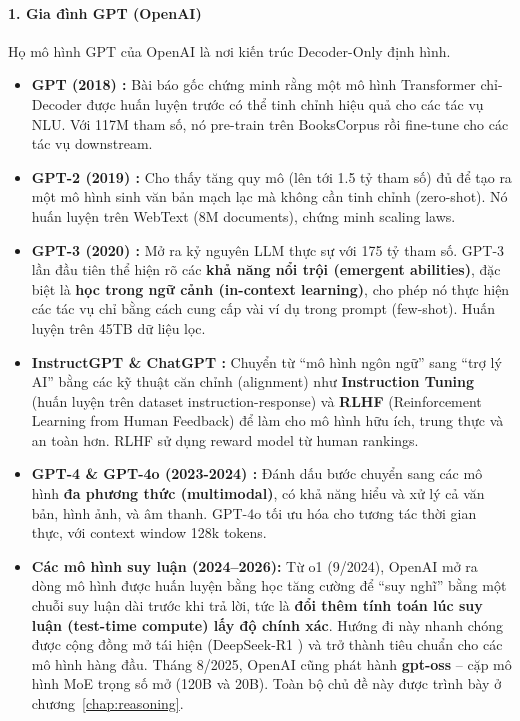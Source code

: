 \paragraph{1. Gia đình GPT (OpenAI)}
Họ mô hình GPT của OpenAI là nơi kiến trúc Decoder-Only định hình.
\begin{itemize}
	\item \textbf{GPT (2018) \cite{radford2018improving}:} Bài báo gốc chứng minh rằng một mô hình Transformer chỉ-Decoder được huấn luyện trước có thể tinh chỉnh hiệu quả cho các tác vụ NLU. Với 117M tham số, nó pre-train trên BooksCorpus rồi fine-tune cho các tác vụ downstream.
	\item \textbf{GPT-2 (2019) \cite{radford2019language}:} Cho thấy tăng quy mô (lên tới 1.5 tỷ tham số) đủ để tạo ra một mô hình sinh văn bản mạch lạc mà không cần tinh chỉnh (zero-shot). Nó huấn luyện trên WebText (8M documents), chứng minh scaling laws.
	\item \textbf{GPT-3 (2020) \cite{brown2020language}:} Mở ra kỷ nguyên LLM thực sự với 175 tỷ tham số. GPT-3 lần đầu tiên thể hiện rõ các \textbf{khả năng nổi trội (emergent abilities)}, đặc biệt là \textbf{học trong ngữ cảnh (in-context learning)}, cho phép nó thực hiện các tác vụ chỉ bằng cách cung cấp vài ví dụ trong prompt (few-shot). Huấn luyện trên 45TB dữ liệu lọc.
	\item \textbf{InstructGPT \& ChatGPT \cite{ouyang2022training}:} Chuyển từ “mô hình ngôn ngữ” sang “trợ lý AI” bằng các kỹ thuật căn chỉnh (alignment) như \textbf{Instruction Tuning} (huấn luyện trên dataset instruction-response) và \textbf{RLHF} (Reinforcement Learning from Human Feedback) để làm cho mô hình hữu ích, trung thực và an toàn hơn. RLHF sử dụng reward model từ human rankings.
	\item \textbf{GPT-4 \& GPT-4o (2023-2024) \cite{openai2023gpt4, openai2024gpt4o}:} Đánh dấu bước chuyển sang các mô hình \textbf{đa phương thức (multimodal)}, có khả năng hiểu và xử lý cả văn bản, hình ảnh, và âm thanh. GPT-4o tối ưu hóa cho tương tác thời gian thực, với context window 128k tokens.
	\item \textbf{Các mô hình suy luận (2024--2026):} Từ o1 (9/2024), OpenAI mở ra dòng mô hình được huấn luyện bằng học tăng cường để “suy nghĩ” bằng một chuỗi suy luận dài trước khi trả lời, tức là \textbf{đổi thêm tính toán lúc suy luận (test-time compute) lấy độ chính xác}. Hướng đi này nhanh chóng được cộng đồng mở tái hiện (DeepSeek-R1 \cite{deepseekai2025r1}) và trở thành tiêu chuẩn cho các mô hình hàng đầu. Tháng 8/2025, OpenAI cũng phát hành \textbf{gpt-oss} -- cặp mô hình MoE trọng số mở (120B và 20B). Toàn bộ chủ đề này được trình bày ở chương~\ref{chap:reasoning}.
\end{itemize}
